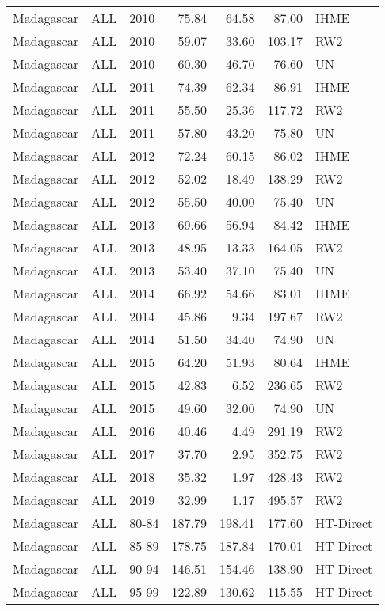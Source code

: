 \begin{longtable}{lllrrrl}
  Madagascar & ALL & 2010 & 75.84 & 64.58 & 87.00 & IHME \\ 
  Madagascar & ALL & 2010 & 59.07 & 33.60 & 103.17 & RW2 \\ 
  Madagascar & ALL & 2010 & 60.30 & 46.70 & 76.60 & UN \\ 
  Madagascar & ALL & 2011 & 74.39 & 62.34 & 86.91 & IHME \\ 
  Madagascar & ALL & 2011 & 55.50 & 25.36 & 117.72 & RW2 \\ 
  Madagascar & ALL & 2011 & 57.80 & 43.20 & 75.80 & UN \\ 
  Madagascar & ALL & 2012 & 72.24 & 60.15 & 86.02 & IHME \\ 
  Madagascar & ALL & 2012 & 52.02 & 18.49 & 138.29 & RW2 \\ 
  Madagascar & ALL & 2012 & 55.50 & 40.00 & 75.40 & UN \\ 
  Madagascar & ALL & 2013 & 69.66 & 56.94 & 84.42 & IHME \\ 
  Madagascar & ALL & 2013 & 48.95 & 13.33 & 164.05 & RW2 \\ 
  Madagascar & ALL & 2013 & 53.40 & 37.10 & 75.40 & UN \\ 
  Madagascar & ALL & 2014 & 66.92 & 54.66 & 83.01 & IHME \\ 
  Madagascar & ALL & 2014 & 45.86 & 9.34 & 197.67 & RW2 \\ 
  Madagascar & ALL & 2014 & 51.50 & 34.40 & 74.90 & UN \\ 
  Madagascar & ALL & 2015 & 64.20 & 51.93 & 80.64 & IHME \\ 
  Madagascar & ALL & 2015 & 42.83 & 6.52 & 236.65 & RW2 \\ 
  Madagascar & ALL & 2015 & 49.60 & 32.00 & 74.90 & UN \\ 
  Madagascar & ALL & 2016 & 40.46 & 4.49 & 291.19 & RW2 \\ 
  Madagascar & ALL & 2017 & 37.70 & 2.95 & 352.75 & RW2 \\ 
  Madagascar & ALL & 2018 & 35.32 & 1.97 & 428.43 & RW2 \\ 
  Madagascar & ALL & 2019 & 32.99 & 1.17 & 495.57 & RW2 \\ 
  Madagascar & ALL & 80-84 & 187.79 & 198.41 & 177.60 & HT-Direct \\ 
  Madagascar & ALL & 85-89 & 178.75 & 187.84 & 170.01 & HT-Direct \\ 
  Madagascar & ALL & 90-94 & 146.51 & 154.46 & 138.90 & HT-Direct \\ 
  Madagascar & ALL & 95-99 & 122.89 & 130.62 & 115.55 & HT-Direct \\ 

\end{longtable}
